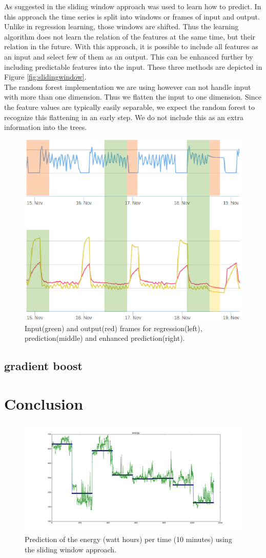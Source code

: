 \documentclass{scrartcl}
\begin{document}
As suggested in \cite{vafaeipour2014application} the sliding window approach was used to learn how to predict. In this approach the time series is split into windows or frames of input and output. Unlike in regression learning, those windows are shifted. Thus the learning algorithm does not learn the relation of the features at the same time, but their relation in the future. With this approach, it is possible to include all features as an input and select few of them as an output. This can be enhanced further by including predictable features into the input. These three methods are depicted in Figure \ref{fig:slidingwindow}.\\
The random forest implementation we are using however can not handle input with more than one dimension. Thus we flatten the input to one dimension. Since the feature values are typically easily separable, we expect the random forest to recognize this flattening in an early step. We do not include this as an extra information into the trees.
\begin{figure}[H]
  \center
  \includegraphics[width=0.6\linewidth]{img/regpred.png}
  \caption{Input(green) and output(red) frames for regression(left), prediction(middle) and enhanced prediction(right).}
  \label{fig:correlation}
\end{figure}

\subsection{gradient boost}

\section{Conclusion}
\label{sec:conclusion}
\begin{figure}[H]
  \center
  \includegraphics[width=0.6\linewidth]{img/predict-energy--0p890.png}
  \caption{Prediction of the energy (watt hours) per time (10 minutes) using the sliding window approach.}
  \label{fig:Prediction}
\end{figure}
\end{document}
